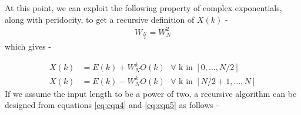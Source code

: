 \documentclass[journal,12pt,twocolumn]{IEEEtran}
\begin{document}
At this point, we can exploit the following property of complex exponentials, along with peridocity, to get a recursive definition of $X(k)$ - 
\begin{align}
    W_\frac{N}{2} = W_{N}^{2}
\end{align}
which gives - 

\begin{align}
    X(k) &= E(k) + W_{N}^k O(k) \text{   } \forall \text{ k in } [0, ..., N/2] \label{eq:eqn4}\\
    X(k) &= E(k) - W_{N}^k O(k) \text{   } \forall \text{ k in } [N/2+1, ..., N]\label{eq:eqn5}
\end{align}
If we assume the input length to be a power of two, a recursive algorithm can be designed from equations \ref{eq:eqn4} and \ref{eq:eqn5}  as follows - 
\end{document}
